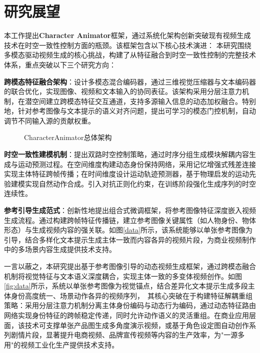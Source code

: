 \section{研究展望}
本工作提出\textbf{Character Animator}框架，通过系统化架构创新突破现有视频生成技术在时空一致性控制方面的瓶颈。该框架包含以下核心技术演进：
本研究围绕多模态驱动视频生成的核心挑战，构建了从特征融合到时空一致性控制的完整技术体系，重点突破以下三个研究方向：

\textbf{跨模态特征融合架构}：设计多模态混合编码器，通过三维视觉压缩器与文本编码器的联合优化，实现图像、视频和文本输入的协同表征。该架构采用分层注意力机制，在潜空间建立跨模态特征交互通道，支持多源输入信息的动态加权融合。特别地，针对参考图像与文本提示的语义对齐问题，提出可学习的模态门控机制，自动调节不同输入源的贡献权重。

\begin{figure}[htbp]
    \centering
    \caption{CharacterAnimator总体架构}
    \label{fig:architecture2}
\end{figure}
\textbf{时空一致性建模机制}：提出双路时空控制策略，通过时序分组生成模块解耦内容生成与运动预测过程。在空间维度构建动态身份保持网络，采用记忆增强式残差连接实现主体特征跨帧传播；在时间维度设计运动轨迹预测器，基于物理启发的运动先验建模实现自然动作合成。引入对抗正则化约束，在训练阶段强化生成序列的时空连续性。

\textbf{参考引导生成范式}：创新性地提出组合式微调框架，将参考图像特征深度嵌入视频生成流程。通过构建跨帧特征传播链，建立参考图像关键属性（如人物身份、物体形态）与生成视频内容的强关联。如图\ref{data}所示，该系统能够以单张参考图像为引导，结合多样化文本提示生成主体一致而内容各异的视频片段，为商业视频制作中的多场景内容生成提供技术支持。

一言以蔽之，本研究提出基于参考图像引导的动态视频生成框架，通过跨模态融合机制将视觉特征与文本语义深度耦合，实现主体一致的多变体视频创作。如图\ref{fig:data}所示，系统以单张参考图像为视觉锚点，结合差异化文本提示生成多段主体身份高度统一、场景动作各异的视频序列，\
其核心突破在于构建特征解耦重组策略：采用分层注意力机制分离主体身份编码与动态行为编码，通过动态特征路由网络实现身份特征的跨帧稳定传递，同时允许动作语义的灵活重组。在商业应用层面，该技术可支撑单张产品图生成多角度演示视频，或基于角色设定图自动创作系列剧情片段，显著提升电商视频、品牌宣传视频等内容的生产效率，为"一源多用"的视频工业化生产提供技术支持。
